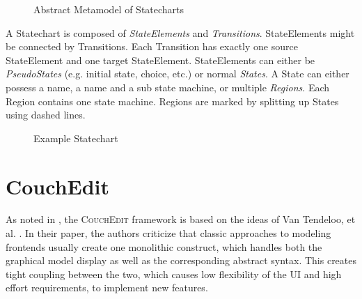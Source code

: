 \begin{figure}
\centering

\caption{Abstract Metamodel of Statecharts}
\label{fig:statechartmm}
\end{figure}


A Statechart is composed of \emph{StateElements} and \emph{Transitions}. StateElements might be connected by Transitions. Each Transition has exactly one source StateElement and one target StateElement. StateElements can either be \emph{PseudoStates} (e.g. initial state, choice, etc.) or normal \emph{States}. A State can either possess a name, a name and a sub state machine, or multiple \emph{Regions}. Each Region contains one state machine. Regions are marked by splitting up States using dashed lines. 

\begin{figure}
\centering

\caption{Example Statechart}
\label{fig:state-example}
\end{figure}




\section{CouchEdit}
\label{sec:CouchEdit}
As noted in , the \textsc{CouchEdit} framework is based on the ideas of Van Tendeloo, et al. \cite{van_tendeloo_concrete_2017}. In their paper, the authors criticize that classic approaches to modeling frontends usually create one monolithic construct, which handles both the graphical model display as well as the corresponding abstract syntax. This creates tight coupling between the two, which causes low flexibility of the UI and high effort requirements, to implement new features. 

